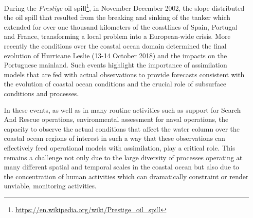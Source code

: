 During the \emph{Prestige} oil
spill\footnote{\url{https://en.wikipedia.org/wiki/Prestige_oil_spill}},
in November-December 2002, the slope %
distributed the oil spill that resulted from the breaking and sinking
of the tanker which extended for over one thousand kilometers of the
coastlines of Spain, Portugal and France, transforming a local problem
into a European-wide crisis. More recently the conditions over the
coastal ocean domain determined the final evolution of Hurricane
Leslie (13-14 October 2018) and the impacts on the Portuguese
mainland. Such events highlight the importance of assimilation models
that are fed with actual observations to provide forecasts consistent
with the evolution of coastal ocean conditions and the crucial role of
subsurface conditions and processes.

In these events, as well as in many routine activities such as support
for Search And Rescue operations, %
environmental assessment for naval operations, the capacity to observe
the actual conditions that affect the water column over the coastal
ocean regions of interest in such a way that these observations can
effectively feed operational models with assimilation, play a critical
role. This remains a challenge not only due to the large diversity of
processes operating at many different spatial and temporal scales in
the coastal ocean but also due to the concentration of human
activities which can dramatically constraint or render unviable,
monitoring activities.

 
